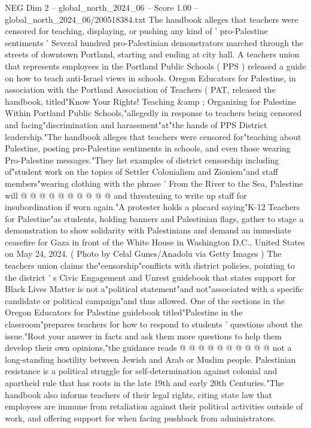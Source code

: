 \begin{textsample}{NEG Dim 2 – global\_north\_2024\_06 – Score 1.00 – global\_north\_2024\_06/200518384.txt}  \label{ex:f2_neg_197}
The handbook alleges that teachers were censored for teaching, displaying, or pushing any kind of ' pro-Palestine sentiments ' Several hundred pro-Palestinian demonstrators marched through the streets of downtown Portland, starting and ending at city hall.
A teachers union that represents employees in the Portland Public Schools ( PPS ) released a guide on how to teach anti-Israel views in schools.
Oregon Educators for Palestine, in association with the Portland Association of Teachers ( PAT, released the handbook, titled"Know Your Rights!
Teaching \&amp ; Organizing for Palestine Within Portland Public Schools,"allegedly in response to teachers being censored and facing"discrimination and harassment"at"the hands of PPS District leadership."The handbook alleges that teachers were censored for"teaching about Palestine, posting pro-Palestine sentiments in schools, and even those wearing Pro-Palestine messages."They list examples of district censorship including of"student work on the topics of Settler Colonialism and Zionism"and staff members"wearing clothing with the phrase ' From the River to the Sea, Palestine will @ @ @ @ @ @ @ @ @ @ and threatening to write up staff for insubordination if worn again."A protester holds a placard saying"K-12 Teachers for Palestine"as students, holding banners and Palestinian flags, gather to stage a demonstration to show solidarity with Palestinians and demand an immediate ceasefire for Gaza in front of the White House in Washington D.C., United States on May 24, 2024. ( Photo by Celal Gunes/Anadolu via Getty Images ) The teachers union claims the"censorship"conflicts with district policies, pointing to the district ' s Civic Engagement and Unrest guidebook that states support for Black Lives Matter is not a"political statement"and not"associated with a specific candidate or political campaign"and thus allowed.
One of the sections in the Oregon Educators for Palestine guidebook titled"Palestine in the classroom"prepares teachers for how to respond to students ' questions about the issue."Root your answer in facts and ask them more questions to help them develop their own opinions,"the guidance reads @ @ @ @ @ @ @ @ @ @ not a long-standing hostility between Jewish and Arab or Muslim people.
Palestinian resistance is a political struggle for self-determination against colonial and apartheid rule that has roots in the late 19th and early 20th Centuries."The handbook also informs teachers of their legal rights, citing state law that employees are immune from retaliation against their political activities outside of work, and offering support for when facing pushback from administrators.

\end{textsample}
